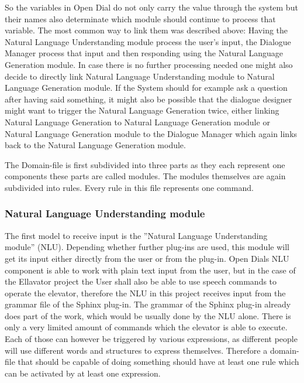 \documentclass[a4paper, 12pt]{article}
\begin{document}
So the variables in Open Dial do not only carry the value through the system but their names also determinate which module should continue to process that variable.
The most common way to link them was described above: 
Having the Natural Language Understanding module process the user's input, the Dialogue Manager process that input and then responding using the Natural Language Generation module. 
In case there is no further processing needed one might also decide to directly link Natural Language Understanding module to Natural Language Generation module. 
If the System should for example ask a question after having said something, it might also be possible that the dialogue designer might want to trigger the Natural Language Generation twice, either linking Natural Language Generation to Natural Language Generation module or Natural Language Generation module to the Dialogue Manager which again links back to the Natural Language Generation module. \newline

The Domain-file is first subdivided into three parts as they each represent one components these parts are called modules. 
The modules themselves are again subdivided into rules. Every rule in this file represents one command. 

\subsubsection{Natural Language Understanding module}

The first model to receive input is the ”Natural Language Understanding module” (NLU). 
Depending whether further plug-ins are used, this module will get its input either directly from the user or from the plug-in.
Open Dials NLU component is able to work with plain text input from the user, but in the case of the Ellavator project the User shall also be able to use speech commands to operate the elevator, therefore the NLU in this project receives input from the grammar file of the Sphinx plug-in.
The grammar of the Sphinx plug-in already does part of the work, which would be usually done by the NLU alone.
There is only a very limited amount of commands which the elevator is able to execute.
Each of those can however be triggered by various expressions, as different people will use different words and structures to express themselves.
Therefore a domain-file that should be capable of doing something should have at least one rule which can be activated by at least one expression. \newline
\end{document}
